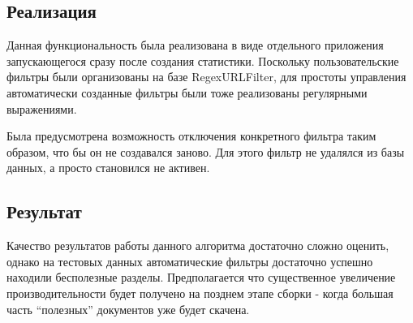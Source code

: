 \subsection*{Реализация}
Данная функциональность была реализована в виде отдельного приложения запускающегося сразу после создания статистики. Поскольку пользовательские фильтры были организованы на базе RegexURLFilter, для простоты управления автоматически созданные фильтры были тоже реализованы регулярными выражениями. 

Была предусмотрена возможность отключения конкретного фильтра таким образом, что бы он не создавался заново. Для этого фильтр не удалялся из базы данных, а просто становился не активен.

\subsection*{Результат}
Качество результатов работы данного алгоритма достаточно сложно оценить, однако на тестовых данных автоматические фильтры достаточно успешно находили бесполезные разделы. Предполагается что существенное увеличение производительности будет получено на позднем этапе сборки - когда большая часть ``полезных'' документов уже будет скачена.
